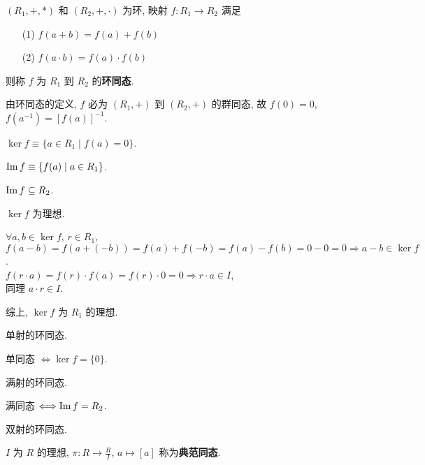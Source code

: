 \documentclass{note}
\begin{document}
\begin{df}[环同态]
    $(R_1,+,*)$ 和 $(R_2,+,\cdot)$ 为环, 映射 $f:R_1\rightarrow R_2$ 满足
    \begin{itemize}
        \item[(1)] $f(a+b)=f(a)+f(b)$
        \item[(2)] $f(a\cdot b)=f(a)\cdot f(b)$
    \end{itemize}
    则称 $f$ 为 $R_1$ 到 $R_2$ 的\textbf{环同态}.
\end{df}

由环同态的定义, $f$ 必为 $(R_1,+)$ 到 $(R_2,+)$ 的群同态, 故 $f(0)=0$, $f(a^{-1})=[f(a)]^{-1}$.

\begin{df}[核]
    $\ker f\equiv\{a\in R_1\mid f(a)=0\}$.
\end{df}

\begin{df}[像]
    $\operatorname{Im} f\equiv\{f(a)\mid a\in R_1\}$.
\end{df}

$\operatorname{Im} f\subseteq R_2$.

\begin{thm}
    $\ker f$ 为理想.
\end{thm}
\begin{pf}
    $\forall a,b\in\ker f$, $r\in R_1$, $f(a-b)=f(a+(-b))=f(a)+f(-b)=f(a)-f(b)=0-0=0\Longrightarrow a-b\in\ker f$.\\
    $f(r\cdot a)=f(r)\cdot f(a)=f(r)\cdot 0=0\Longrightarrow r\cdot a\in I$,\\
    同理 $a\cdot r\in I$.

    综上, $\ker f$ 为 $R_1$ 的理想.
\end{pf}

\begin{df}[单同态]
    单射的环同态.
\end{df}

单同态 $\Longleftrightarrow\ker f=\{0\}$.

\begin{df}[满同态]
    满射的环同态.
\end{df}

满同态 $\Longleftrightarrow\operatorname{Im} f=R_2$.

\begin{df}[同构]
    双射的环同态.
\end{df}

\begin{df}[典范同态]
    $I$ 为 $R$ 的理想, $\pi:R\rightarrow\frac{R}{I}$, $a\mapsto[a]$ 称为\textbf{典范同态}.
\end{df}
\end{document}
